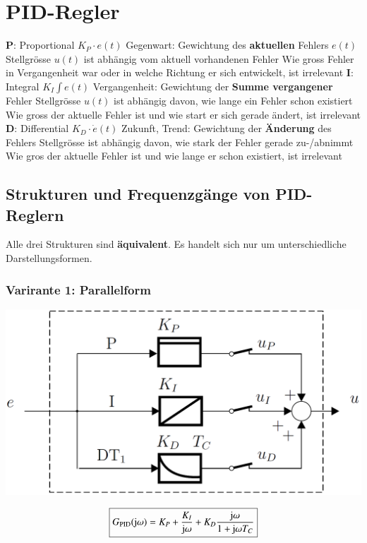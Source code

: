 \section{PID-Regler}

\begin{outline}
    \1 \textbf{P}: Proportional $K_P \cdot e(t)$
        \2 Gegenwart: Gewichtung des \textbf{aktuellen} Fehlers $e(t)$
            \3 Stellgrösse $u(t)$ ist abhängig vom aktuell vorhandenen Fehler
            \3 Wie gross Fehler in Vergangenheit war oder in welche Richtung er sich entwickelt, ist irrelevant
    \1 \textbf{I}: Integral $K_I \int e(t)$
        \2 Vergangenheit: Gewichtung der \textbf{Summe vergangener} Fehler
            \3  Stellgrösse $u(t)$ ist abhängig davon, wie lange ein Fehler schon existiert
            \3 Wie gross der aktuelle Fehler ist und wie start er sich gerade ändert, ist irrelevant
    \1 \textbf{D}: Differential $K_D \cdot \dot{e}(t)$
        \2 Zukunft, Trend: Gewichtung der \textbf{Änderung} des Fehlers
            \3 Stellgrösse ist abhängig davon, wie stark der Fehler gerade zu-/abnimmt
            \3 Wie gros der aktuelle Fehler ist und wie lange er schon existiert, ist irrelevant
\end{outline}


\subsection{Strukturen und Frequenzgänge von PID-Reglern}
\label{Strukturen PID-Regler}

Alle drei Strukturen sind \textbf{äquivalent}. Es handelt sich nur um unterschiedliche Darstellungsformen.


\subsubsection{Varirante 1: Parallelform}
\label{PID-Regler Parallelform}

\begin{minipage}[c]{0.45\columnwidth}
    \includegraphics[width=\columnwidth]{images/pid_regler_aufbau.png}
\end{minipage}
\hfill
\begin{minipage}[c]{0.48\columnwidth}
    $$ \boxed{ G_{\rm PID}(\mathrm{j} \omega) = K_P + \frac{K_I}{\mathrm{j} \omega} + K_D \frac{\mathrm{j} \omega}{1 + \mathrm{j} \omega T_C} } $$
\end{minipage}


